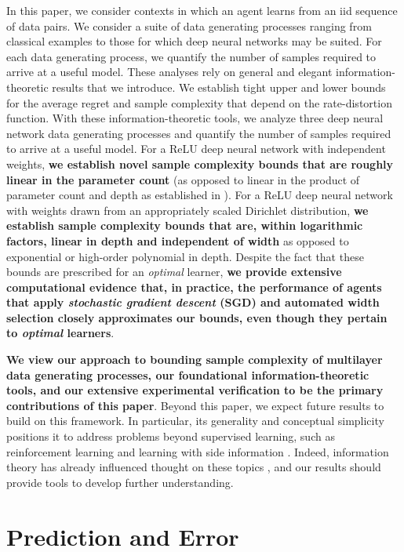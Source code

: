 \documentclass[twoside,11pt]{article}
\begin{document}
In this paper, we consider contexts in which an agent learns from an iid sequence of data pairs. We consider a suite of data generating processes ranging from classical examples to those for which deep neural networks may be suited. For each data generating process, we quantify the number of samples required to arrive at a useful model.  These analyses rely on general and elegant information-theoretic results that we introduce. We establish tight upper and lower bounds for the average regret and sample complexity that depend on the rate-distortion function. With these information-theoretic tools, we analyze three deep neural network data generating processes and quantify the number of samples required to arrive at a useful model. For a ReLU deep neural network with independent weights, \textbf{we establish novel sample complexity bounds that are roughly linear in the parameter count} (as opposed to linear in the product of parameter count and depth as established in \citep{pmlr-v65-harvey17a}). For a ReLU deep neural network with weights drawn from an appropriately scaled Dirichlet distribution, \textbf{we establish sample complexity bounds that are, within logarithmic factors, linear in depth and independent of width} as opposed to exponential \citep{bartlett2017spectrally} or high-order polynomial \citep{NEURIPS2019_0e795480} in depth. Despite the fact that these bounds are prescribed for an \emph{optimal} learner, \textbf{we provide extensive computational evidence that, in practice, the performance of agents that apply \emph{stochastic gradient descent} (SGD) and automated width selection closely approximates our bounds, even though they pertain to \emph{optimal} learners}.


\textbf{We view our approach to bounding sample complexity of multilayer data generating processes, our foundational information-theoretic tools, and our extensive experimental verification to be the primary contributions of this paper}. Beyond this paper, we expect future results to build on this framework.  In particular, its generality and conceptual simplicity positions it to address problems beyond supervised learning, such as reinforcement learning \citep{sutton2018reinforcement} and learning with side information \citep{jonschkowski2015patterns}.  Indeed, information theory has already influenced thought on these topics \citep{lu2021reinforcement}, and our results should provide tools to develop further understanding.

\section{Prediction and Error}
\label{se:rate-distortion}
\end{document}

